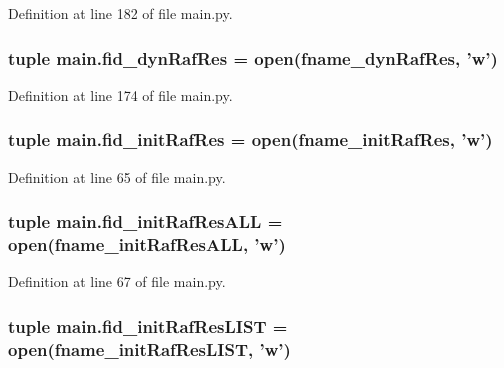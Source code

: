 Definition at line 182 of file main.\-py.

\hypertarget{a00117_aaff6b4fb4c2e2089c2a207a12f1757e3}{
\subsubsection[{fid\-\_\-dyn\-Raf\-Res}]{\setlength{\rightskip}{0pt plus 5cm}tuple main.\-fid\-\_\-dyn\-Raf\-Res = open({\bf fname\-\_\-dyn\-Raf\-Res}, 'w')}}\label{a00117_aaff6b4fb4c2e2089c2a207a12f1757e3}


Definition at line 174 of file main.\-py.

\hypertarget{a00117_a98d514a663f6bedde329d0bbbd2b78fa}{
\subsubsection[{fid\-\_\-init\-Raf\-Res}]{\setlength{\rightskip}{0pt plus 5cm}tuple main.\-fid\-\_\-init\-Raf\-Res = open({\bf fname\-\_\-init\-Raf\-Res}, 'w')}}\label{a00117_a98d514a663f6bedde329d0bbbd2b78fa}


Definition at line 65 of file main.\-py.

\hypertarget{a00117_a45aeb03f0d9cc30cb0a490354fd76d6c}{
\subsubsection[{fid\-\_\-init\-Raf\-Res\-A\-L\-L}]{\setlength{\rightskip}{0pt plus 5cm}tuple main.\-fid\-\_\-init\-Raf\-Res\-A\-L\-L = open({\bf fname\-\_\-init\-Raf\-Res\-A\-L\-L}, 'w')}}\label{a00117_a45aeb03f0d9cc30cb0a490354fd76d6c}


Definition at line 67 of file main.\-py.

\hypertarget{a00117_ae24c607a37f0f3f23d7e87f6bb4fe45b}{
\subsubsection[{fid\-\_\-init\-Raf\-Res\-L\-I\-S\-T}]{\setlength{\rightskip}{0pt plus 5cm}tuple main.\-fid\-\_\-init\-Raf\-Res\-L\-I\-S\-T = open({\bf fname\-\_\-init\-Raf\-Res\-L\-I\-S\-T}, 'w')}}\label{a00117_ae24c607a37f0f3f23d7e87f6bb4fe45b}


